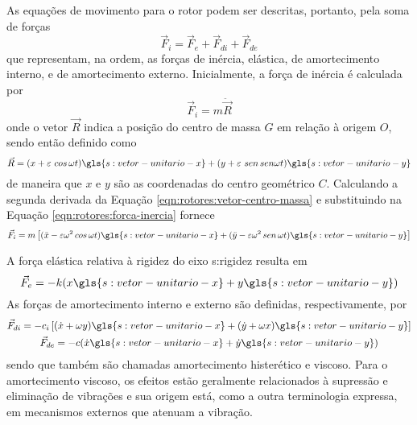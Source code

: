 \documentclass[12pt,openright,oneside,a4paper,
	chapter=TITLE,section=TITLE,
	english,brazil]{abntex2}
\begin{document}
	As equações de movimento para o rotor podem ser descritas, portanto, pela soma de forças \cite{rao:2008}
	\begin{equation} \label{eqn:rotores:forcas}
		\vec{F}_i = \vec{F}_e + \vec{F}_{di} + \vec{F}_{de}
	\end{equation}
	que representam, na ordem, as forças de inércia, elástica, de amortecimento interno, e de amortecimento externo. Inicialmente, a força de inércia é calculada por \cite{rao:2008}
	\begin{equation} \label{eqn:rotores:forca-inercia}
		\vec{F}_i = m\ddot{\vec{R}}
	\end{equation}
	onde o vetor $ \vec{R} $ indica a posição do centro de massa $ \mathit{G} $ em relação à origem $ \mathit{O} $, sendo então definido como \cite{rao:2008}
	\begin{equation} \label{eqn:rotores:vetor-centro-massa}
		\vec{R} = (x + \varepsilon\ cos\,\omega t)\gls{s:vetor-unitario-x} + (y + \varepsilon\ sen\,sen\omega t)\gls{s:vetor-unitario-y}
	\end{equation}
	de maneira que $ x $ e $ y $ são as coordenadas do centro geométrico $ \mathit{C} $. Calculando a segunda derivada da Equação \ref{eqn:rotores:vetor-centro-massa} e substituindo na Equação \ref{eqn:rotores:forca-inercia} fornece
	\begin{equation} \label{eqn:rotres:forca-inercia}
		\vec{F}_i = m\left[ (\ddot{x} - \varepsilon\omega^2\,cos\,\omega t)\gls{s:vetor-unitario-x} +
		(\ddot{y} - \varepsilon\omega^2\,sen\,\omega t)\gls{s:vetor-unitario-y} \right]
	\end{equation}
	
	A força elástica relativa à rigidez do eixo \gls{s:rigidez} resulta em \cite{rao:2008}
	\begin{equation}\label{eqn:rotores:forca-elastica}
		\vec{F}_e = -k(x\gls{s:vetor-unitario-x} + y\gls{s:vetor-unitario-y})
	\end{equation}
	As forças de amortecimento interno e externo são definidas, respectivamente, por \cite{rao:2008}
	\begin{gather}
		\vec{F}_{di} = -c_i\left[(\dot{x} + \omega y)\gls{s:vetor-unitario-x} +
		(\dot{y} + \omega x)\gls{s:vetor-unitario-y} \right] \label{eqn:rotores:forca-amort-interno} \\
		\vec{F}_{de} = -c(\dot{x}\gls{s:vetor-unitario-x} + \dot{y}\gls{s:vetor-unitario-y}) \label{eqn:rotores:forca-amort-externo}
	\end{gather}
	sendo que também são chamadas amortecimento histerético e viscoso. Para o amortecimento viscoso, os efeitos estão geralmente relacionados à supressão e eliminação de vibrações \cite{dimarogonas:1995} e sua origem está, como a outra terminologia expressa, em mecanismos externos que atenuam a vibração.
	
\end{document}
